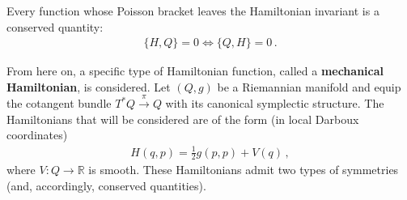 
    \begin{theorem}[Noether]\label{symplectic:noether}
        Every function whose Poisson bracket leaves the Hamiltonian invariant is a conserved quantity:
        \begin{gather}
            \{H,Q\} = 0\iff\{Q,H\} = 0\,.
        \end{gather}
    \end{theorem}

    From here on, a specific type of Hamiltonian function, called a \textbf{mechanical Hamiltonian}, is considered. Let $(Q,g)$ be a Riemannian manifold and equip the cotangent bundle $T^*Q\overset{\pi}{\rightarrow}Q$ with its canonical symplectic structure. The Hamiltonians that will be considered are of the form (in local Darboux coordinates)
    \begin{gather}
        H(q,p) = \frac{1}{2}g(p,p) + V(q)\,,
    \end{gather}
    where $V:Q\rightarrow\mathbb{R}$ is smooth. These Hamiltonians admit two types of symmetries (and, accordingly, conserved quantities).

